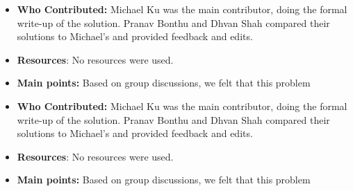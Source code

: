 \documentclass[11pt]{article}
\begin{document}

\begin{itemize}
    \item \textbf{Who Contributed:} Michael Ku was the main contributor, doing the formal write-up of the solution. Pranav Bonthu and Dhvan Shah compared their solutions to Michael's and provided feedback and edits.
    \item \textbf{Resources}: No resources were used.
    \item \textbf{Main points:} Based on group discussions, we felt that this problem
\end{itemize}

\begin{itemize}
    \item \textbf{Who Contributed:} Michael Ku was the main contributor, doing the formal write-up of the solution. Pranav Bonthu and Dhvan Shah compared their solutions to Michael's and provided feedback and edits.
    \item \textbf{Resources}: No resources were used.
    \item \textbf{Main points:} Based on group discussions, we felt that this problem
\end{itemize}
\end{document}
